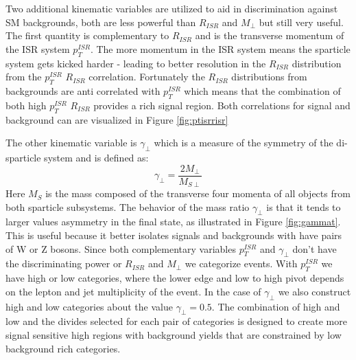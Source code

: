 Two additional kinematic variables are utilized to aid in discrimination against SM backgrounds, both are less powerful than $R_{ISR}$ and $M_\perp$ but still very useful. The first quantity is complementary to $R_{ISR}$ and is the transverse momentum of the ISR system $p_T^{ISR}$. The more momentum in the ISR system means the sparticle system gets kicked harder - leading to better resolution in the $R_{ISR}$ distribution from the $p_T^{ISR}$ $R_{ISR}$ correlation. Fortunately the $R_{ISR}$  distributions from backgrounds are anti correlated with $p_T^{ISR}$ which means that the combination of both high  $p_T^{ISR}$ $R_{ISR}$ provides a rich signal region. Both correlations for signal and background can are visualized in Figure \ref{fig:ptisrrisr}


 The other kinematic variable is $\gamma_\perp$ which is a measure of the symmetry of the di-sparticle system and is defined as:
\begin{equation}
\gamma_\perp = \frac{2M_\perp}{M_{S\perp}}
\end{equation}
Here $M_S$ is the mass composed of the transverse four momenta of all objects from  both sparticle subsystems. The behavior of the mass ratio $\gamma_\perp$ is that it tends to larger values asymmetry in the final state, as illustrated in Figure \ref{fig:gammat}. This is useful because it better isolates signals and backgrounds with have pairs of W or Z bosons. Since both complementary variables $p_T^{ISR}$ and $\gamma_\perp$ don't have the discriminating power or $R_{ISR}$ and $M_\perp$ we categorize events. With $p_T^{ISR}$ we have high or low categories, where the lower edge and low to high pivot depends on the lepton and jet multiplicity of the event. In the case of $\gamma_\perp$ we also construct high and low categories about the value $\gamma_\perp= 0.5$. The combination of high and low and the divides selected for each pair of categories is designed to create more signal sensitive high regions with background yields that are constrained by low background rich categories.

  


